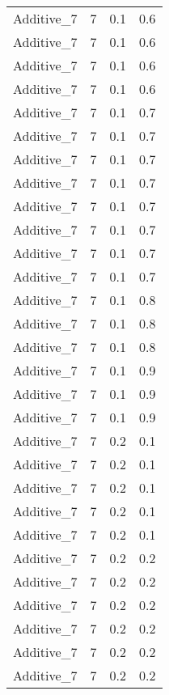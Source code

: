 \documentclass{article}
\begin{document}
\begin{longtable}[H]{lrrr}
 Additive\_7 &       7 &   0.1 &            0.6 \\
 Additive\_7 &       7 &   0.1 &            0.6 \\
 Additive\_7 &       7 &   0.1 &            0.6 \\
 Additive\_7 &       7 &   0.1 &            0.6 \\
 Additive\_7 &       7 &   0.1 &            0.7 \\
 Additive\_7 &       7 &   0.1 &            0.7 \\
 Additive\_7 &       7 &   0.1 &            0.7 \\
 Additive\_7 &       7 &   0.1 &            0.7 \\
 Additive\_7 &       7 &   0.1 &            0.7 \\
 Additive\_7 &       7 &   0.1 &            0.7 \\
 Additive\_7 &       7 &   0.1 &            0.7 \\
 Additive\_7 &       7 &   0.1 &            0.7 \\
 Additive\_7 &       7 &   0.1 &            0.8 \\
 Additive\_7 &       7 &   0.1 &            0.8 \\
 Additive\_7 &       7 &   0.1 &            0.8 \\
 Additive\_7 &       7 &   0.1 &            0.9 \\
 Additive\_7 &       7 &   0.1 &            0.9 \\
 Additive\_7 &       7 &   0.1 &            0.9 \\
 Additive\_7 &       7 &   0.2 &            0.1 \\
 Additive\_7 &       7 &   0.2 &            0.1 \\
 Additive\_7 &       7 &   0.2 &            0.1 \\
 Additive\_7 &       7 &   0.2 &            0.1 \\
 Additive\_7 &       7 &   0.2 &            0.1 \\
 Additive\_7 &       7 &   0.2 &            0.2 \\
 Additive\_7 &       7 &   0.2 &            0.2 \\
 Additive\_7 &       7 &   0.2 &            0.2 \\
 Additive\_7 &       7 &   0.2 &            0.2 \\
 Additive\_7 &       7 &   0.2 &            0.2 \\
 Additive\_7 &       7 &   0.2 &            0.2 \\

\end{longtable}
\end{document}
